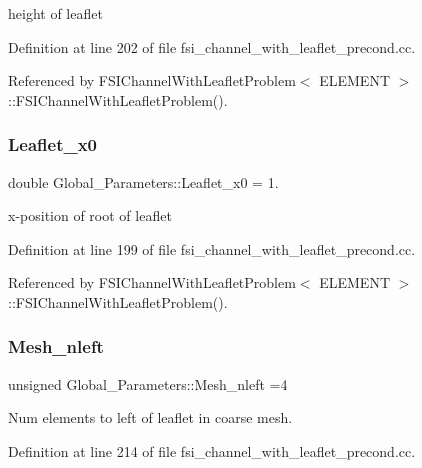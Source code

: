 height of leaflet 



Definition at line 202 of file fsi\+\_\+channel\+\_\+with\+\_\+leaflet\+\_\+precond.\+cc.



Referenced by F\+S\+I\+Channel\+With\+Leaflet\+Problem$<$ E\+L\+E\+M\+E\+N\+T $>$\+::\+F\+S\+I\+Channel\+With\+Leaflet\+Problem().

\mbox{\label{namespaceGlobal__Parameters_a84d27a1abb5d90476de43a9920dc347f}} 
\subsubsection{\texorpdfstring{Leaflet\+\_\+x0}{Leaflet\_x0}}
{\footnotesize\ttfamily double Global\+\_\+\+Parameters\+::\+Leaflet\+\_\+x0 = 1.}



x-\/position of root of leaflet 



Definition at line 199 of file fsi\+\_\+channel\+\_\+with\+\_\+leaflet\+\_\+precond.\+cc.



Referenced by F\+S\+I\+Channel\+With\+Leaflet\+Problem$<$ E\+L\+E\+M\+E\+N\+T $>$\+::\+F\+S\+I\+Channel\+With\+Leaflet\+Problem().

\mbox{\label{namespaceGlobal__Parameters_a899325ce0b7ede8237bd52d8f0fd44e2}} 
\subsubsection{\texorpdfstring{Mesh\+\_\+nleft}{Mesh\_nleft}}
{\footnotesize\ttfamily unsigned Global\+\_\+\+Parameters\+::\+Mesh\+\_\+nleft =4}



Num elements to left of leaflet in coarse mesh. 



Definition at line 214 of file fsi\+\_\+channel\+\_\+with\+\_\+leaflet\+\_\+precond.\+cc.



